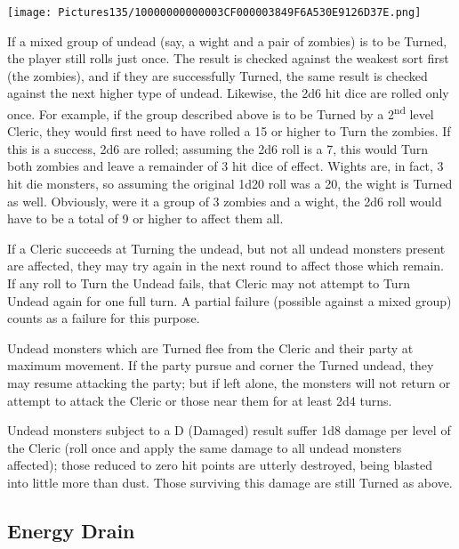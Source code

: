 \documentclass[a4paper,twoside,openany,10pt]{book}
\begin{document}
\begin{multicols}{2}
	

\begin{flushleft}
	\texttt{[image: Pictures135/10000000000003CF000003849F6A530E9126D37E.png]}
\end{flushleft}

If a mixed group of undead (say, a wight and a pair of zombies) is to be Turned, the player still rolls just once. The result is checked against the weakest sort first (the zombies), and if they are successfully Turned, the same result is checked against the next higher type of undead. Likewise, the 2d6 hit dice are rolled only once. For example, if the group described above is to be Turned by a 2\textsuperscript{nd} level Cleric, they would first need to have rolled a 15 or higher to Turn the zombies. If this is a success, 2d6 are rolled; assuming the 2d6 roll is a 7, this would Turn both zombies and leave a remainder of 3 hit dice of effect. Wights are, in fact, 3 hit die monsters, so assuming the original 1d20 roll was a 20, the wight is Turned as well. Obviously, were it a group of 3 zombies and a wight, the 2d6 roll would have to be a total of 9 or higher to affect them all.

If a Cleric succeeds at Turning the undead, but not all undead monsters present are affected, they may try again in the next round to affect those which remain. If any roll to Turn the Undead fails, that Cleric may not attempt to Turn Undead again for one full turn. A partial failure (possible against a mixed group) counts as a failure for this purpose.

Undead monsters which are Turned flee from the Cleric and their party at maximum movement. If the party pursue and corner the Turned undead, they may resume attacking the party; but if left alone, the monsters will not return or attempt to attack the Cleric or those near them for at least 2d4 turns.

Undead monsters subject to a D (Damaged) result suffer 1d8 damage per level of the Cleric (roll once and apply the same damage to all undead monsters affected); those reduced to zero hit points are utterly destroyed, being blasted into little more than dust. Those surviving this damage are still Turned as above.

\subsection{Energy Drain}\label{energy-drain}


\end{multicols}
\end{document}
